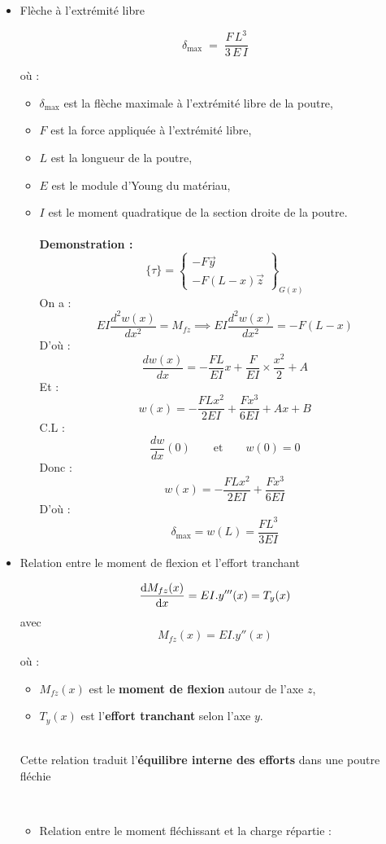 \documentclass[12pt, a4paper]{article}
\begin{document}
\begin{itemize}
    \item Flèche à l'extrémité libre

    \[
\delta_{\text{max}} \;=\; \frac{F\,L^{3}}{3\,E\,I}
\]

où :
\begin{itemize}
  \item $\delta_{\text{max}}$ est la flèche maximale à l'extrémité libre de la poutre,
  \item $F$ est la force appliquée à l’extrémité libre,
  \item $L$ est la longueur de la poutre,
  \item $E$ est le module d’Young du matériau,
  \item $I$ est le moment quadratique de la section droite de la poutre.
\\\\
\textbf{Demonstration :}
\[
\{ \tau \} =  \left\{\begin{matrix}
-F\vec y \\
-F(L-x)\vec z
\end{matrix}\right\}_{G(x)}
\]
On a : 
\[EI\frac{d^2w(x)}{dx^2}=M_{fz}
\implies EI\frac{d^2w(x)}{dx^2}=-F(L-x) \] D'où : 
\[\frac{dw(x)}{dx}=-\frac{FL}{EI}x+\frac{F}{EI}\times\frac{x^2}{2}+A\]
Et : 
\[w(x)=-\frac{FLx^2}{2EI}+\frac{Fx^3}{6EI}+Ax+B\]
C.L :
\[\frac{dw}{dx}(0) \qquad \text{et}\qquad w(0)=0\]
Donc : 
\[w(x)=-\frac{FLx^2}{2EI}+\frac{Fx^3}{6EI}\]
D'où : 
\[\delta_{\max}=w(L)=\frac{FL^3}{3EI}\]


\end{itemize}

    \item Relation entre le moment de flexion et l'effort tranchant

    \[
\dv{M_{fz}(x)}{x} =EI.y'''(x)= T_y(x)
\]
avec \[
M_{fz}(x) =EI.y''(x)
\]

où :
\begin{itemize}
  \item $M_{fz}(x)$ est le \textbf{moment de flexion} autour de l’axe $z$,
  \item $T_y(x)$ est l’\textbf{effort tranchant} selon l’axe $y$.

\end{itemize}
\\

Cette relation traduit l’\textbf{équilibre interne des efforts} dans une poutre fléchie

\\
\begin{itemize}
\item Relation entre le moment fléchissant et la charge répartie :


\end{itemize}
\end{itemize}
\end{document}
